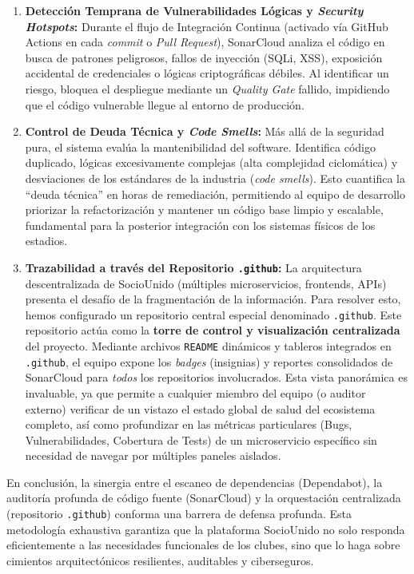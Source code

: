 \begin{enumerate}
    \item \textbf{Detección Temprana de Vulnerabilidades Lógicas y \textit{Security Hotspots}:} Durante el flujo de Integración Continua (activado vía GitHub Actions en cada \textit{commit} o \textit{Pull Request}), SonarCloud analiza el código en busca de patrones peligrosos, fallos de inyección (SQLi, XSS), exposición accidental de credenciales o lógicas criptográficas débiles. Al identificar un riesgo, bloquea el despliegue mediante un \textit{Quality Gate} fallido, impidiendo que el código vulnerable llegue al entorno de producción.
    \item \textbf{Control de Deuda Técnica y \textit{Code Smells}:} Más allá de la seguridad pura, el sistema evalúa la mantenibilidad del software. Identifica código duplicado, lógicas excesivamente complejas (alta complejidad ciclomática) y desviaciones de los estándares de la industria (\textit{code smells}). Esto cuantifica la ``deuda técnica'' en horas de remediación, permitiendo al equipo de desarrollo priorizar la refactorización y mantener un código base limpio y escalable, fundamental para la posterior integración con los sistemas físicos de los estadios.
    \item \textbf{Trazabilidad a través del Repositorio \texttt{.github}:} La arquitectura descentralizada de SocioUnido (múltiples microservicios, frontends, APIs) presenta el desafío de la fragmentación de la información. Para resolver esto, hemos configurado un repositorio central especial denominado \texttt{.github}. Este repositorio actúa como la \textbf{torre de control y visualización centralizada} del proyecto. Mediante archivos \texttt{README} dinámicos y tableros integrados en \texttt{.github}, el equipo expone los \textit{badges} (insignias) y reportes consolidados de SonarCloud para \textit{todos} los repositorios involucrados. Esta vista panorámica es invaluable, ya que permite a cualquier miembro del equipo (o auditor externo) verificar de un vistazo el estado global de salud del ecosistema completo, así como profundizar en las métricas particulares (Bugs, Vulnerabilidades, Cobertura de Tests) de un microservicio específico sin necesidad de navegar por múltiples paneles aislados.
\end{enumerate}

En conclusión, la sinergia entre el escaneo de dependencias (Dependabot), la auditoría profunda de código fuente (SonarCloud) y la orquestación centralizada (repositorio \texttt{.github}) conforma una barrera de defensa profunda. Esta metodología exhaustiva garantiza que la plataforma SocioUnido no solo responda eficientemente a las necesidades funcionales de los clubes, sino que lo haga sobre cimientos arquitectónicos resilientes, auditables y ciberseguros.

